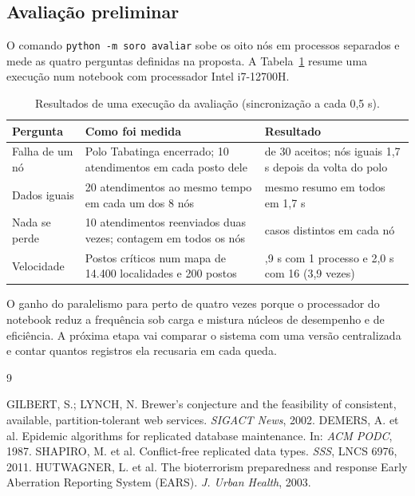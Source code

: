 \documentclass[a4paper,12pt]{article}
\begin{document}
\subsection{Avaliação preliminar}

O comando \texttt{python -m soro avaliar} sobe os oito nós em processos separados e mede
as quatro perguntas definidas na proposta. A Tabela~\ref{tab:avaliacao} resume uma
execução num notebook com processador Intel i7-12700H.

\begin{table}[htbp]
  \centering
  \caption{Resultados de uma execução da avaliação (sincronização a cada 0,5 s).}
  \label{tab:avaliacao}
  \small
  \begin{tabularx}{\textwidth}{>{\raggedright\arraybackslash}p{3.2cm}X>{\raggedright\arraybackslash}p{4.2cm}}
    \toprule
    Pergunta & Como foi medida & Resultado \\
    \midrule
    Falha de um nó & Polo Tabatinga encerrado; 10 atendimentos em cada posto dele & 30 de 30 aceitos; nós iguais 1,7 s depois da volta do polo \\
    Dados iguais & 20 atendimentos ao mesmo tempo em cada um dos 8 nós & mesmo resumo em todos em 1,7 s \\
    Nada se perde & 10 atendimentos reenviados duas vezes; contagem em todos os nós & 200 casos distintos em cada nó \\
    Velocidade & Postos críticos num mapa de 14.400 localidades e 200 postos & 7,9 s com 1 processo e 2,0 s com 16 (3,9 vezes) \\
    \bottomrule
  \end{tabularx}
\end{table}

O ganho do paralelismo para perto de quatro vezes porque o processador do notebook reduz a
frequência sob carga e mistura núcleos de desempenho e de eficiência. A próxima etapa vai
comparar o sistema com uma versão centralizada e contar quantos registros ela recusaria em
cada queda.

\footnotesize
\begin{thebibliography}{9}
 GILBERT, S.; LYNCH, N. Brewer's conjecture and the feasibility of
  consistent, available, partition-tolerant web services. \textit{SIGACT News}, 2002.
 DEMERS, A. et al. Epidemic algorithms for replicated database
  maintenance. In: \textit{ACM PODC}, 1987.
 SHAPIRO, M. et al. Conflict-free replicated data types.
  \textit{SSS}, LNCS 6976, 2011.
 HUTWAGNER, L. et al. The bioterrorism preparedness and response
  Early Aberration Reporting System (EARS). \textit{J. Urban Health}, 2003.
\end{thebibliography}
\end{document}
